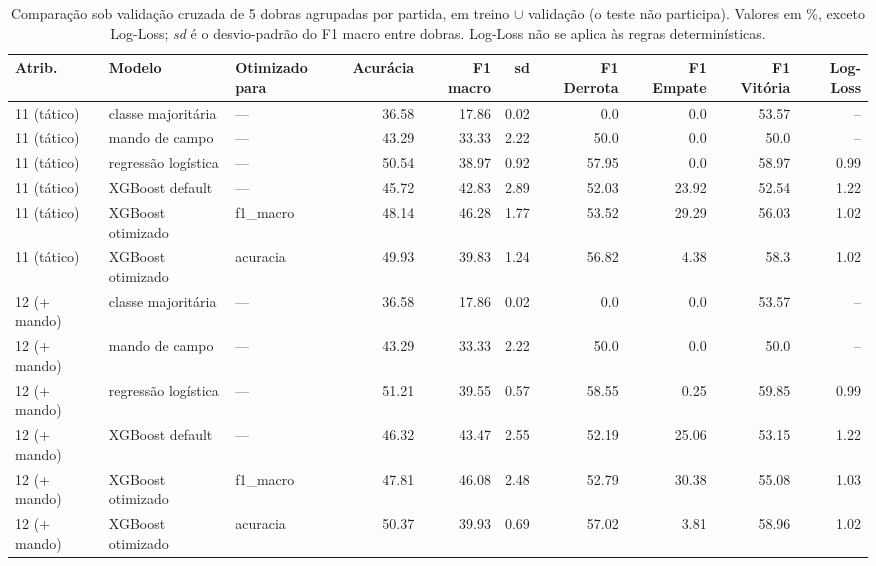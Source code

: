 \begin{table}[htbp]
\centering
\caption{Comparação sob validação cruzada de 5 dobras agrupadas por partida, em treino $\cup$ validação (o teste não participa). Valores em \%, exceto Log-Loss; \emph{sd} é o desvio-padrão do F1 macro entre dobras. Log-Loss não se aplica às regras determinísticas.}
\label{tab:wp2-comparativo}
\small
\begin{tabular}{lllrrrrrrr}
\toprule
Atrib. & Modelo & Otimizado para & Acurácia & F1 macro & sd & F1 Derrota & F1 Empate & F1 Vitória & Log-Loss \\
\midrule
11 (tático) & classe majoritária & — & 36.58 & 17.86 & 0.02 & 0.0 & 0.0 & 53.57 & -- \\
11 (tático) & mando de campo & — & 43.29 & 33.33 & 2.22 & 50.0 & 0.0 & 50.0 & -- \\
11 (tático) & regressão logística & — & 50.54 & 38.97 & 0.92 & 57.95 & 0.0 & 58.97 & 0.99 \\
11 (tático) & XGBoost default & — & 45.72 & 42.83 & 2.89 & 52.03 & 23.92 & 52.54 & 1.22 \\
11 (tático) & XGBoost otimizado & f1\_macro & 48.14 & 46.28 & 1.77 & 53.52 & 29.29 & 56.03 & 1.02 \\
11 (tático) & XGBoost otimizado & acuracia & 49.93 & 39.83 & 1.24 & 56.82 & 4.38 & 58.3 & 1.02 \\
12 (+ mando) & classe majoritária & — & 36.58 & 17.86 & 0.02 & 0.0 & 0.0 & 53.57 & -- \\
12 (+ mando) & mando de campo & — & 43.29 & 33.33 & 2.22 & 50.0 & 0.0 & 50.0 & -- \\
12 (+ mando) & regressão logística & — & 51.21 & 39.55 & 0.57 & 58.55 & 0.25 & 59.85 & 0.99 \\
12 (+ mando) & XGBoost default & — & 46.32 & 43.47 & 2.55 & 52.19 & 25.06 & 53.15 & 1.22 \\
12 (+ mando) & XGBoost otimizado & f1\_macro & 47.81 & 46.08 & 2.48 & 52.79 & 30.38 & 55.08 & 1.03 \\
12 (+ mando) & XGBoost otimizado & acuracia & 50.37 & 39.93 & 0.69 & 57.02 & 3.81 & 58.96 & 1.02 \\
\bottomrule
\end{tabular}
\end{table}
